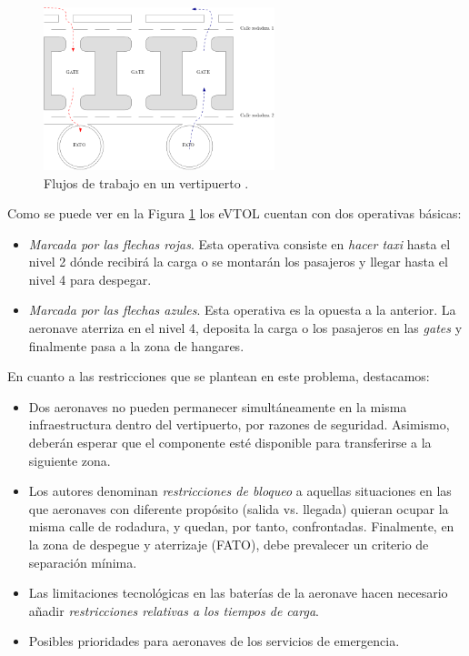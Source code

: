 \documentclass[12pt,a4paper]{book}
\begin{document}
\begin{figure}[h]
    \begin{center}
    \includegraphics[width=0.6\textwidth]{img/proceso_verti.png}
    \end{center}
    \caption{Flujos de trabajo en un vertipuerto \cite{espejo-diaz_heuristic_2023}.}
    \label{fig:proceso-trabajo-verti}
\end{figure} 

Como se puede ver en la Figura \ref{fig:proceso-trabajo-verti} los eVTOL cuentan con dos operativas básicas: 
\begin{itemize}
	\item {\sl Marcada por las flechas rojas}. Esta operativa consiste en \textsl{hacer taxi} hasta el nivel 2 dónde recibirá la carga o se montarán los pasajeros y llegar hasta el nivel 4 para despegar.
	\item {\sl Marcada por las flechas azules}. Esta operativa es la opuesta a la anterior. La aeronave aterriza en el nivel 4, deposita la carga o los pasajeros en las \textsl{gates} y finalmente pasa a la zona de hangares.   
\end{itemize}

En cuanto a las restricciones que se plantean en este problema, destacamos: 
\begin{itemize}
	\item Dos aeronaves no pueden permanecer simultáneamente en la misma infraestructura dentro del vertipuerto, por razones de seguridad. Asimismo, deberán esperar que el componente esté disponible para transferirse a la siguiente zona. 
	\item Los autores denominan \textsl{restricciones de bloqueo} a aquellas situaciones en las que aeronaves con diferente propósito (salida vs. llegada) quieran ocupar la misma calle de rodadura, y quedan, por tanto, confrontadas. Finalmente, en la zona de despegue y aterrizaje (FATO), debe prevalecer un criterio de separación mínima. 
	\item Las limitaciones tecnológicas en las baterías de la aeronave hacen necesario añadir \textsl{restricciones relativas a los tiempos de carga}. 
	\item Posibles prioridades para aeronaves de los servicios de emergencia. 
\end{itemize}
\end{document}
